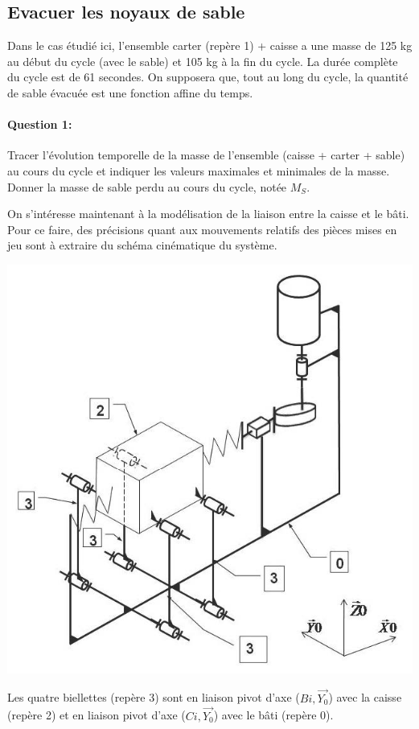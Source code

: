 \subsection{Evacuer les noyaux de sable}

Dans le cas étudié ici, l'ensemble carter (repère 1) + caisse a une masse de 125 kg au début du cycle (avec le sable) et 105 kg à la fin du cycle. La durée complète du cycle est de 61 secondes. On supposera que, tout au long du cycle, la quantité de sable évacuée est une fonction affine du temps.

\paragraph{Question 1:} Tracer l'évolution temporelle de la masse de l'ensemble (caisse + carter + sable) au cours du cycle et indiquer les valeurs maximales et minimales de la masse. Donner la masse de sable perdu au cours du cycle, notée $M_S$.

On s'intéresse maintenant à la modélisation de la liaison entre la caisse et le bâti. Pour ce faire, des précisions quant aux mouvements relatifs des pièces mises en jeu sont à extraire du schéma cinématique du système.

\begin{center}
	\includegraphics[width=0.7\linewidth]{img/Decocheuse_cin}
\end{center}

Les quatre biellettes (repère 3) sont en liaison pivot d'axe ($Bi,\overrightarrow{Y_0}$) avec la caisse (repère 2) et en liaison pivot d'axe ($Ci,\overrightarrow{Y_0}$) avec le bâti (repère 0).


